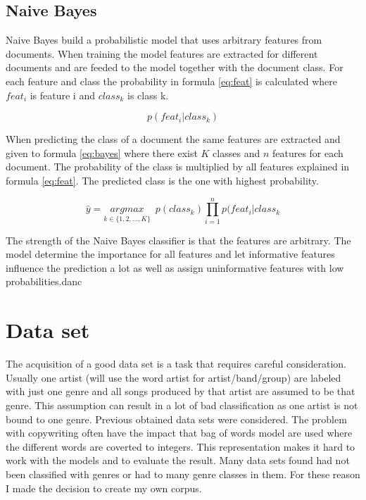 \documentclass[a4paper, 12pt]{article}
\begin{document}
\subsection{Naive Bayes}
Naive Bayes build a probabilistic model that uses arbitrary features from documents.
When training the model features are extracted for different documents and are feeded to the model together with the document class.
For each feature and class the probability in formula \ref{eq:feat} is calculated where $ feat_{i}$ is feature i and $ class_k $ is class k.

\large
\begin{equation}
    p (feat_{i}|class_{k})
    \label{eq:feat}
\end{equation}
\normalsize

When predicting the class of a document the same features are extracted and given to formula \ref{eq:bayes} where there exist $K$ classes and $n$ features for each document.
The probability of the class is multiplied by all features explained in formula \ref{eq:feat}.
The predicted class is the one with highest probability.

\large
\begin{equation}
    \hat{y} = \underset{k \in \{1,2,...,K\}}{argmax} \, \, \, p(class_{k}) \prod_{i=1}^{n} p (feat_{i}|class_{k}
    \label{eq:bayes}
\end{equation}
\normalsize

The strength of the Naive Bayes classifier is that the features are arbitrary.
The model determine the importance for all features and let informative features influence the prediction a lot as well as assign uninformative features with low probabilities.danc

\section{Data set}
\label{sec:dataset}
The acquisition of a good data set is a task that requires careful consideration.
Usually one artist (will use the word artist for artist/band/group) are labeled with just one genre and all songs produced by that artist are assumed to be that genre. 
This assumption can result in a lot of bad classification as one artist is not bound to one genre.
Previous obtained data sets were considered.
The problem with copywriting often have the impact that bag of words model are used where the different words are coverted to integers. 
This representation makes it hard to work with the models and to evaluate the result.
Many data sets found had not been classified with genres or had to many genre classes in them.
For these reason I made the decision to create my own corpus.
\end{document}
